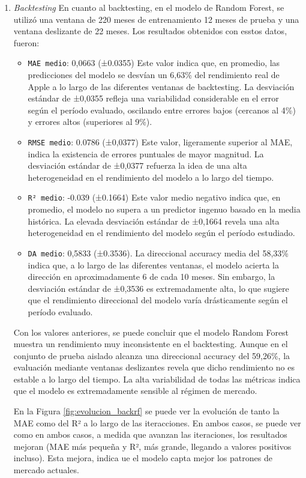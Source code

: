 \begin{enumerate}
    \item \emph{Backtesting}
    En cuanto al backtesting, en el modelo de Random Forest, se utilizó una ventana de 220 meses de entrenamiento 12 meses de prueba y una ventana deslizante de 22 meses. Los resultados obtenidos con esstos datos, fueron:

    \begin{itemize}
        \item \texttt{MAE medio}: 0,0663 (±0.0355) Este valor indica que, en promedio, las predicciones del modelo se desvían un 6,63\% del rendimiento real de Apple a lo largo de las diferentes ventanas de backtesting. La desviación estándar de ±0,0355 refleja una variabilidad considerable en el error según el período evaluado, oscilando entre errores bajos (cercanos al 4\%) y errores altos (superiores al 9\%).
        \item \texttt{RMSE medio}: 0.0786 (±0,0377) Este valor, ligeramente superior al MAE, indica la existencia de errores puntuales de mayor magnitud. La desviación estándar de ±0,0377 refuerza la idea de una alta heterogeneidad en el rendimiento del modelo a lo largo del tiempo.
        \item \texttt{R² medio}: -0.039 (±0.1664) Este valor medio negativo indica que, en promedio, el modelo no supera a un predictor ingenuo basado en la media histórica. La elevada desviación estándar de ±0,1664 revela una alta heterogeneidad en el rendimiento del modelo según el período estudiado.
        \item \texttt{DA medio}: 0,5833 (±0.3536). La direccional accuracy media del 58,33\% indica que, a lo largo de las diferentes ventanas, el modelo acierta la dirección en aproximadamente 6 de cada 10 meses. Sin embargo, la desviación estándar de ±0,3536 es extremadamente alta, lo que sugiere que el rendimiento direccional del modelo varía drásticamente según el período evaluado.
    \end{itemize}

    Con los valores anteriores, se puede concluir que el modelo Random Forest muestra un rendimiento muy inconsistente en el backtesting. Aunque en el conjunto de prueba aislado alcanza una direccional accuracy del 59,26\%, la evaluación mediante ventanas deslizantes revela que dicho rendimiento no es estable a lo largo del tiempo. La alta variabilidad de todas las métricas indica que el modelo es extremadamente sensible al régimen de mercado.

    En la Figura \ref{fig:evolucion_backrf} se puede ver la evolución de tanto la MAE como del R² a lo largo de las iteracciones. En ambos casos, se puede ver como en ambos casos, a medida que avanzan las iteraciones, los resultados mejoran (MAE más pequeña y R², más grande, llegando a valores positivos incluso). Esta mejora, indica ue el modelo capta mejor los patrones de mercado actuales.


\end{enumerate}
